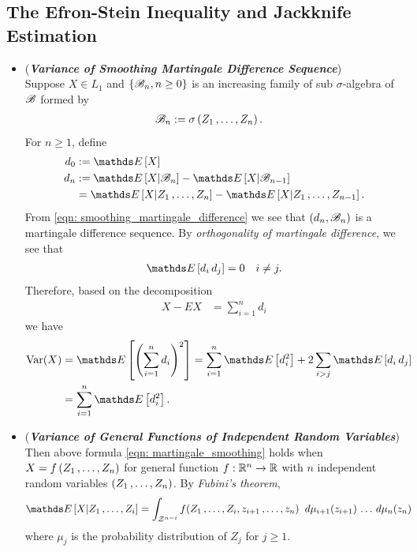 \documentclass[11pt]{article}
\begin{document}
\subsection{The Efron-Stein Inequality and Jackknife Estimation}
\begin{itemize}
\item \begin{remark} (\textbf{\emph{Variance of Smoothing Martingale Difference Sequence}})\\
Suppose $X \in L_1$ and $\left\{{\mathscr B}_n, n \ge 0\right\}$ is an increasing family of sub $\sigma$-algebra of ${\mathscr B}$ formed by 
\begin{align*}
{\mathscr B}_n &:= \sigma\left(Z_1 \,{,}\ldots{,}\, Z_n\right).
\end{align*} For $n \ge 1$, define 
\begin{align*}
d_0 &:= \E{}{X} \\ 
d_n &:= \E{}{X | \srB_n} - \E{}{X | \srB_{n-1}} \\
&= \E{}{X | Z_1 \xdotx{,} Z_n} -  \E{}{X | Z_1 \xdotx{,} Z_{n-1}}.
\end{align*} From \eqref{eqn: smoothing_martingale_difference} we see that $(d_n, {\mathscr B}_n)$ is a martingale difference sequence. By \emph{orthogonality of martingale difference}, we see that 
\begin{align*}
\E{}{d_i\, d_j} =0 \quad i\neq j.
\end{align*} Therefore, based on the decomposition
\begin{align*}
X - E{}{X} &= \sum_{i=1}^{n}d_i
\end{align*}
we have 
\begin{align}
\text{Var}(X) &= \E{}{\paren{\sum_{i=1}^{n}d_i}^2} = \sum_{i=1}^{n}\E{}{d_i^2} + 2 \sum_{i > j}\E{}{d_i\,d_j}\nonumber\\
&=  \sum_{i=1}^{n}\E{}{d_i^2}. \label{eqn: martingale_smoothing}
\end{align}
\end{remark}

\item \begin{remark}(\textbf{\emph{Variance of General Functions of Independent Random Variables}})\\
Then above formula \eqref{eqn: martingale_smoothing} holds when $X = f\left(Z_1 \,{,}\ldots{,}\, Z_n\right)$ for general function $f: {\mathbb R}^n \to {\mathbb R}$ with $n$ independent random variables $(Z_1 \,{,}\ldots{,}\, Z_n)$. By \emph{Fubini's theorem},
\begin{align*}
 \E{}{X | Z_1 \xdotx{,} Z_i} &= \int_{\cZ^{n-i}} f(Z_1 \xdotx{,} Z_i, z_{i+1} \xdotx{,} z_n) \;\;d\mu_{i+1}(z_{i+1})  \xdotx{} d\mu_{n}(z_{n})
\end{align*} where $\mu_j$ is the probability distribution of $Z_j$ for $j \ge 1$. 


\end{remark}
\end{itemize}
\end{document}
